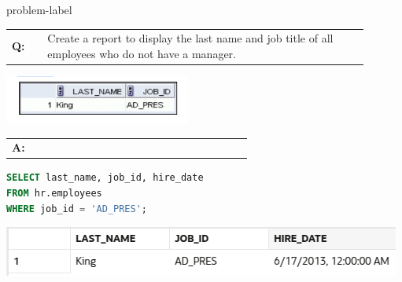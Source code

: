 \begin{problem}{}{problem-label}

\begin{tabular}{@{}l p{0.9\linewidth}@{}}
  \textbf{Q:} & Create a report to display the last name and job title of all employees who do not have a
manager.
\end{tabular}

\begin{center}
  \includegraphics[scale=0.8]{images/c2q8.png}
\end{center}

\begin{tabular}{@{}l p{0.9\linewidth}@{}}
  \textbf{A:} & 
\end{tabular}

\begin{lstlisting}[language=SQL]
SELECT last_name, job_id, hire_date
FROM hr.employees
WHERE job_id = 'AD_PRES';
\end{lstlisting}

\vspace{1em}

\begin{center}
  \includegraphics[scale=0.8]{images/c2a8.png}
\end{center}

\end{problem}

